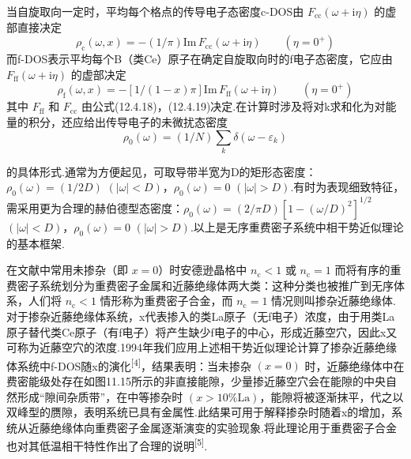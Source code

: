 当自旋取向一定时，平均每个格点的传导电子态密度c-DOS由 $F_{\mathrm{cc}}\left(\omega+\mathrm{i}\eta\right)$ 的虚部直接决定
\begin{equation}
  \rho_{\mathrm{c}}\left(\omega,x\right)=-\left(1/\pi\right)\mathrm{Im}\,F_{\mathrm{cc}}\left(\omega+\mathrm{i}\eta\right)
  \qquad\left(\eta=0^{+}\right)
\end{equation}
而f-DOS表示平均每个B（类Ce）原子在确定自旋取向时的f电子态密度，它应由 $F_{\mathrm{ff}}\left(\omega+\mathrm{i}\eta\right)$ 的虚部决定
\begin{equation}
  \rho_{\mathrm{f}}\left(\omega,x\right)
  =-\left[1/\left(1-x\right)\pi\right]\mathrm{Im}\,F_{\mathrm{ff}}\left(\omega+\mathrm{i}\eta\right)
  \qquad\left(\eta=0^{+}\right)
\end{equation}
其中 $F_{\mathrm{ff}}$ 和 $F_{\mathrm{cc}}$ 由公式(12.4.18)，(12.4.19)决定.在计算时涉及将对k求和化为对能量的积分，还应给出传导电子的未微扰态密度
\begin{equation}
  \rho_{0}\left(\omega\right)=\left(1/N\right)\sum_{k}\delta\left(\omega-\varepsilon_{k}\right)
\end{equation}
{\sloppy
的具体形式.通常为方便起见，可取导带半宽为D的矩形态密度：$\rho_{0}\left(\omega\right)=\left(1/2D\right)$ $\left(|\omega|<D\right)$，$\rho_{0}\left(\omega\right)=0$ $\left(|\omega|>D\right)$.有时为表现细致特征，需采用更为合理的赫伯德型态密度：$\rho_{0}\left(\omega\right)=\left(2/\pi D\right)\left[1-\left(\omega/D\right)^{2}\right]^{1/2}$ $\left(|\omega|<D\right)$，$\rho_{0}\left(\omega\right)=0$ $\left(|\omega|>D\right)$.以上是无序重费密子系统中相干势近似理论的基本框架.\par}

在文献中常用未掺杂（即 $x=0$）时安德逊晶格中 $n_{\mathrm{c}}<1$ 或 $n_{\mathrm{c}}=1$ 而将有序的重费密子系统划分为重费密子金属和近藤绝缘体两大类：这种分类也被推广到无序体系，人们将 $n_{\mathrm{c}}<1$ 情形称为重费密子合金，而 $n_{\mathrm{c}}=1$ 情况则叫掺杂近藤绝缘体.对于掺杂近藤绝缘体系统，x代表掺入的类La原子（无f电子）浓度，由于用类La原子替代类Ce原子（有f电子）将产生缺少f电子的中心，形成近藤空穴，因此x又可称为近藤空穴的浓度.1994年我们应用上述相干势近似理论计算了掺杂近藤绝缘体系统中f-DOS随x的演化\textsuperscript{[4]}，结果表明：当未掺杂 $\left(x=0\right)$ 时，近藤绝缘体中在费密能级处存在如图11.15所示的非直接能隙，少量掺近藤空穴会在能隙的中央自然形成“隙间杂质带”，在中等掺杂时 $\left(x>10\%\mathrm{La}\right)$，能隙将被逐渐抹平，代之以双峰型的赝隙，表明系统已具有金属性.此结果可用于解释掺杂时随着x的增加，系统从近藤绝缘体向重费密子金属逐渐演变的实验现象.将此理论用于重费密子合金也对其低温相干特性作出了合理的说明\textsuperscript{[5]}.

